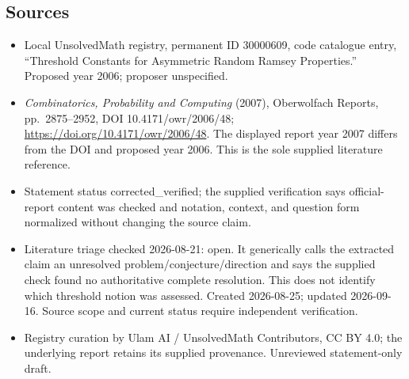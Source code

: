 \documentclass[11pt]{article}
\begin{document}
\subsection{Sources}
\begin{itemize}
\item Local UnsolvedMath registry, permanent ID 30000609, code catalogue entry, ``Threshold Constants for Asymmetric Random Ramsey Properties.'' Proposed year 2006; proposer unspecified.
\item \emph{Combinatorics, Probability and Computing} (2007), Oberwolfach Reports, pp.\ 2875--2952, DOI 10.4171/owr/2006/48; \url{https://doi.org/10.4171/owr/2006/48}. The displayed report year 2007 differs from the DOI and proposed year 2006. This is the sole supplied literature reference.
\item Statement status corrected\_verified; the supplied verification says official-report content was checked and notation, context, and question form normalized without changing the source claim.
\item Literature triage checked 2026-08-21: open. It generically calls the extracted claim an unresolved problem/conjecture/direction and says the supplied check found no authoritative complete resolution. This does not identify which threshold notion was assessed. Created 2026-08-25; updated 2026-09-16. Source scope and current status require independent verification.
\item Registry curation by Ulam AI / UnsolvedMath Contributors, CC BY 4.0; the underlying report retains its supplied provenance. Unreviewed statement-only draft.
\end{itemize}
\end{document}
